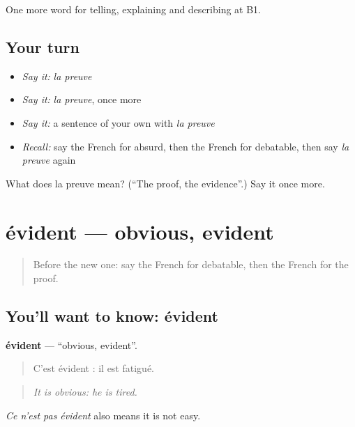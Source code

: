 \begin{grammarlens}[title={What you've built}]
One more word for telling, explaining and describing at B1.
\end{grammarlens}

\subsection*{Your turn}
\begin{itemize}
\raggedright
  \item \emph{Say it:} \emph{la preuve}
  \item \emph{Say it:} \emph{la preuve}, once more
  \item \emph{Say it:} a sentence of your own with \emph{la preuve}
  \item \emph{Recall:} say the French for absurd, then the French for debatable, then say \emph{la preuve} again
\end{itemize}

\begin{tcolorbox}[breakable,colback=teal!4,colframe=teal!35!black,title={Before you move on}]
What does la preuve mean? (\textquotedblleft{}The proof, the evidence\textquotedblright{}.) Say it once more.
\end{tcolorbox}
\section[évident]{évident — obvious, evident}

\label{lesson:FR-C339-evident}



\begin{quote}
Before the new one: say the French for debatable, then the French for the proof.
\end{quote}

\subsection*{You'll want to know: évident}
\textbf{évident} — \textquotedblleft{}obvious, evident\textquotedblright{}.

\begin{quote}
C'est évident : il est fatigué.
\end{quote}

\begin{quote}
\emph{It is obvious: he is tired.}
\end{quote}

\emph{Ce n'est pas évident} also means it is not easy.

